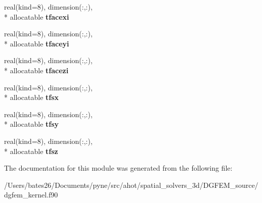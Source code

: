 \begin{DoxyCompactItemize}
\item 
\hypertarget{classdgfem__kernel__module_af42dd3f4f583d8432912c15f2a5cf3dd}{real(kind=8), dimension(\+:,\+:), \\*
allocatable {\bfseries tfacexi}}\label{classdgfem__kernel__module_af42dd3f4f583d8432912c15f2a5cf3dd}

\item 
\hypertarget{classdgfem__kernel__module_a68ae2f84e123935b49b31f7919328a05}{real(kind=8), dimension(\+:,\+:), \\*
allocatable {\bfseries tfaceyi}}\label{classdgfem__kernel__module_a68ae2f84e123935b49b31f7919328a05}

\item 
\hypertarget{classdgfem__kernel__module_aba37bea00bccf7932a71e8373227a826}{real(kind=8), dimension(\+:,\+:), \\*
allocatable {\bfseries tfacezi}}\label{classdgfem__kernel__module_aba37bea00bccf7932a71e8373227a826}

\item 
\hypertarget{classdgfem__kernel__module_a241926bb840141b2c22f1a70d8c337af}{real(kind=8), dimension(\+:,\+:), \\*
allocatable {\bfseries tfsx}}\label{classdgfem__kernel__module_a241926bb840141b2c22f1a70d8c337af}

\item 
\hypertarget{classdgfem__kernel__module_a92037d1eb02c4c4ba55ecfbb1577fa32}{real(kind=8), dimension(\+:,\+:), \\*
allocatable {\bfseries tfsy}}\label{classdgfem__kernel__module_a92037d1eb02c4c4ba55ecfbb1577fa32}

\item 
\hypertarget{classdgfem__kernel__module_ae9e5a881069ba9b29b234b4e39d5688c}{real(kind=8), dimension(\+:,\+:), \\*
allocatable {\bfseries tfsz}}\label{classdgfem__kernel__module_ae9e5a881069ba9b29b234b4e39d5688c}

\end{DoxyCompactItemize}


The documentation for this module was generated from the following file\+:\begin{DoxyCompactItemize}
\item 
/\+Users/bates26/\+Documents/pyne/src/ahot/spatial\+\_\+solvers\+\_\+3d/\+D\+G\+F\+E\+M\+\_\+source/dgfem\+\_\+kernel.\+f90\end{DoxyCompactItemize}
